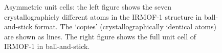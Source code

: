 \begin{figure}[t]
  \centering
  \caption{Asymmetric unit cells: the left figure shows the seven crystallographicly different atoms in the IRMOF-1 structure in
           ball-and-stick format. The `copies' (crystallographically identical atoms) are shown as lines. The right figure
           shows the full unit cell of IRMOF-1 in ball-and-stick.}
  \label{Fig: asymmetric}
\end{figure}

